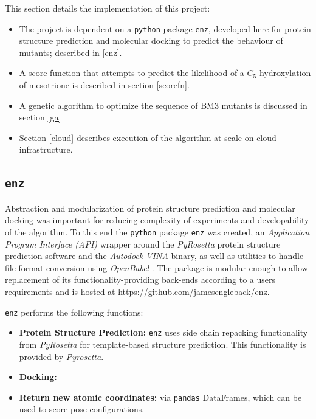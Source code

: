 \documentclass[16pt]{book}
\begin{document}
This section details the implementation of this project:
\begin{itemize}
	\item The project is dependent on a \texttt{python} package \texttt{enz}, developed here for protein structure prediction and molecular docking to predict the behaviour of mutants; described in \ref{enz}.
	\item A score function that attempts to predict the likelihood of a $C_5$ hydroxylation of mesotrione is described in section \ref{scorefn}.
	\item A genetic algorithm to optimize the sequence of BM3 mutants is discussed in section \ref{ga} 
	\item Section \ref{cloud} describes execution of the algorithm at scale on cloud infrastructure.
\end{itemize}


\subsection{\texttt{enz} \label{enz}}

Abstraction and modularization of protein structure prediction and molecular docking was important for reducing complexity of experiments and developability of the algorithm.
To this end the \texttt{python} package \texttt{enz} was created, an \textit{Application Program Interface (API)} wrapper around the \textit{PyRosetta} \cite{chaudhury2010pyrosetta} protein structure prediction software and the \textit{Autodock VINA} \cite{trott2010autodock} binary, as well as utilities to handle file format conversion using \textit{OpenBabel} \cite{o2011open}.
The package is modular enough to allow replacement of its functionality-providing back-ends according to a users requirements and is hosted at \href{https://github.com/jamesengleback/enz}{https://github.com/jamesengleback/enz}.

\texttt{enz} performs the following functions:
\begin{itemize}
	\item \textbf{Protein Structure Prediction:} \texttt{enz} uses side chain repacking \cite{dunbrack1993backbone} functionality from \textit{PyRosetta} for template-based structure prediction. 
		This functionality is provided by \textit{Pyrosetta}.
	\item \textbf{Docking:}
	\item \textbf{Return new atomic coordinates:} via \texttt{pandas} DataFrames, which can be used to score pose configurations.
\end{itemize}
\end{document}
